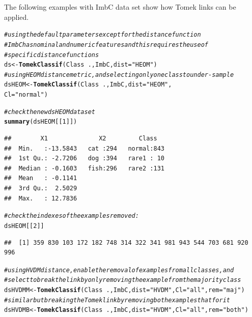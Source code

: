 \documentclass[10pt,a4paper]{article}\usepackage[]{graphicx}\usepackage[]{color}
\makeatletter
\newcommand{\hlnum}[1]{\textcolor[rgb]{0.686,0.059,0.569}{#1}}%
\newcommand{\hlstr}[1]{\textcolor[rgb]{0.192,0.494,0.8}{#1}}%
\newcommand{\hlcom}[1]{\textcolor[rgb]{0.678,0.584,0.686}{\textit{#1}}}%
\newcommand{\hlopt}[1]{\textcolor[rgb]{0,0,0}{#1}}%
\newcommand{\hlstd}[1]{\textcolor[rgb]{0.345,0.345,0.345}{#1}}%
\newcommand{\hlkwb}[1]{\textcolor[rgb]{0.69,0.353,0.396}{#1}}%
\newcommand{\hlkwc}[1]{\textcolor[rgb]{0.333,0.667,0.333}{#1}}%
\newcommand{\hlkwd}[1]{\textcolor[rgb]{0.737,0.353,0.396}{\textbf{#1}}}%
\newenvironment{kframe}{%
 \def\at@end@of@kframe{}%
 \ifinner\ifhmode%
  \def\at@end@of@kframe{\end{minipage}}%
  \begin{minipage}{\columnwidth}%
 \fi\fi%
 \def\FrameCommand##1{\hskip\@totalleftmargin \hskip-\fboxsep
 \colorbox{shadecolor}{##1}\hskip-\fboxsep
     \hskip-\linewidth \hskip-\@totalleftmargin \hskip\columnwidth}%
 \MakeFramed {\advance\hsize-\width
   \@totalleftmargin\z@ \linewidth\hsize
   \@setminipage}}%
 {\par\unskip\endMakeFramed%
 \at@end@of@kframe}
\newenvironment{knitrout}{}{} %
\makeatother
\begin{document}
The following examples with ImbC data set show how Tomek links can be applied.

\begin{knitrout}\footnotesize
{}\color{fgcolor}\begin{kframe}
\begin{alltt}
\hlcom{# using the default parameters except for the distance function}
\hlcom{# ImbC has nominal and numeric features and this requires the use of }
\hlcom{# specific distance functions}
  \hlstd{ds} \hlkwb{<-} \hlkwd{TomekClassif}\hlstd{(Class}\hlopt{~}\hlstd{., ImbC,} \hlkwc{dist}\hlstd{=}\hlstr{"HEOM"}\hlstd{)}
\hlcom{# using HEOM distance metric, and selecting only one class to under-sample}
  \hlstd{dsHEOM} \hlkwb{<-} \hlkwd{TomekClassif}\hlstd{(Class}\hlopt{~}\hlstd{., ImbC,} \hlkwc{dist}\hlstd{=}\hlstr{"HEOM"}\hlstd{,}
                         \hlkwc{Cl}\hlstd{=}\hlstr{"normal"}\hlstd{)}

\hlcom{# check the new dsHEOM data set}
  \hlkwd{summary}\hlstd{(dsHEOM[[}\hlnum{1}\hlstd{]])}
\end{alltt}
\begin{verbatim}
##        X1              X2         Class    
##  Min.   :-13.5843   cat :294   normal:843  
##  1st Qu.: -2.7206   dog :394   rare1 : 10  
##  Median : -0.1603   fish:296   rare2 :131  
##  Mean   : -0.1141                          
##  3rd Qu.:  2.5029                          
##  Max.   : 12.7836
\end{verbatim}
\begin{alltt}
\hlcom{# check the indexes of the examples removed:}
  \hlstd{dsHEOM[[}\hlnum{2}\hlstd{]]}
\end{alltt}
\begin{verbatim}
##  [1] 359 830 103 172 182 748 314 322 341 981 943 544 703 681 920 996
\end{verbatim}
\begin{alltt}
\hlcom{# using HVDM distance, enable the removal of examples from all classes, and}
\hlcom{# select to break the link by only removing the example from the majority class}
  \hlstd{dsHVDMM} \hlkwb{<-} \hlkwd{TomekClassif}\hlstd{(Class}\hlopt{~}\hlstd{., ImbC,} \hlkwc{dist}\hlstd{=}\hlstr{"HVDM"}\hlstd{,} \hlkwc{Cl}\hlstd{=}\hlstr{"all"}\hlstd{,} \hlkwc{rem}\hlstd{=}\hlstr{"maj"}\hlstd{)}
\hlcom{# similar but breaking the Tomek link by removing both examples that for it}
  \hlstd{dsHVDMB} \hlkwb{<-} \hlkwd{TomekClassif}\hlstd{(Class}\hlopt{~}\hlstd{., ImbC,} \hlkwc{dist}\hlstd{=}\hlstr{"HVDM"}\hlstd{,} \hlkwc{Cl}\hlstd{=}\hlstr{"all"}\hlstd{,} \hlkwc{rem}\hlstd{=}\hlstr{"both"}\hlstd{)}
\end{alltt}
\end{kframe}
\end{knitrout}
\end{document}
